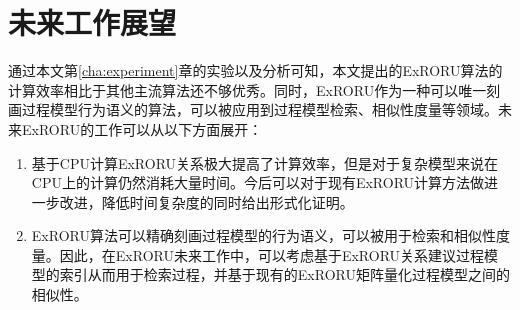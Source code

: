\section{未来工作展望}\label{sec:future_work}
通过本文第\ref{cha:experiment}章的实验以及分析可知，本文提出的ExRORU算法的计算效率相比于其他主流算法还不够优秀。同时，ExRORU作为一种可以唯一刻画过程模型行为语义的算法，可以被应用到过程模型检索、相似性度量等领域。未来ExRORU的工作可以从以下方面展开：
\begin{enumerate}[1.]
  \item 基于CPU计算ExRORU关系极大提高了计算效率，但是对于复杂模型来说在CPU上的计算仍然消耗大量时间。今后可以对于现有ExRORU计算方法做进一步改进，降低时间复杂度的同时给出形式化证明。
  \item ExRORU算法可以精确刻画过程模型的行为语义，可以被用于检索和相似性度量。因此，在ExRORU未来工作中，可以考虑基于ExRORU关系建议过程模型的索引从而用于检索过程，并基于现有的ExRORU矩阵量化过程模型之间的相似性。
\end{enumerate}
